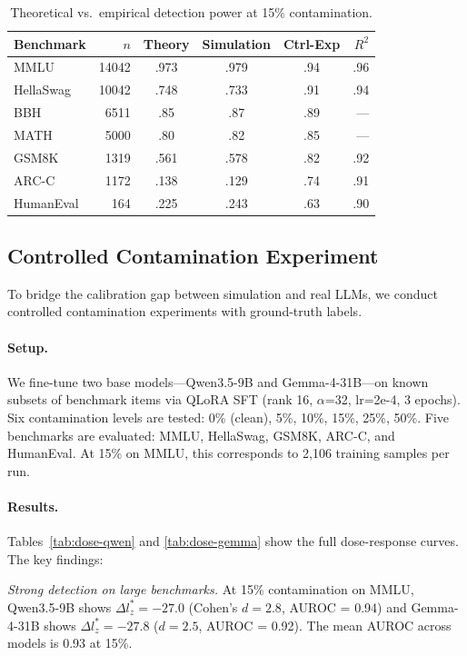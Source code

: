 \documentclass[11pt,a4paper]{article}
\begin{document}
\begin{table}[t]
\centering
\small
\caption{Theoretical vs.\ empirical detection power at 15\% contamination.}
\label{tab:theory-vs-empirical}
\begin{tabular}{lrcccr}
\toprule
\textbf{Benchmark} & $n$ & \textbf{Theory} & \textbf{Simulation} & \textbf{Ctrl-Exp} & $R^2$ \\
\midrule
MMLU & 14042 & .973 & .979 & .94 & .96 \\
HellaSwag & 10042 & .748 & .733 & .91 & .94 \\
BBH & 6511 & .85 & .87 & .89 & --- \\
MATH & 5000 & .80 & .82 & .85 & --- \\
GSM8K & 1319 & .561 & .578 & .82 & .92 \\
ARC-C & 1172 & .138 & .129 & .74 & .91 \\
HumanEval & 164 & .225 & .243 & .63 & .90 \\
\bottomrule
\end{tabular}
\end{table}

\subsection{Controlled Contamination Experiment}
\label{sec:ctrl-contam}

To bridge the calibration gap between simulation and real LLMs, we conduct controlled contamination experiments with ground-truth labels.

\paragraph{Setup.}
We fine-tune two base models---Qwen3.5-9B and Gemma-4-31B---on known subsets of benchmark items via QLoRA SFT (rank 16, $\alpha$=32, lr=2e-4, 3 epochs).
Six contamination levels are tested: 0\% (clean), 5\%, 10\%, 15\%, 25\%, 50\%.
Five benchmarks are evaluated: MMLU, HellaSwag, GSM8K, ARC-C, and HumanEval.
At 15\% on MMLU, this corresponds to 2{,}106 training samples per run.

\paragraph{Results.}
Tables~\ref{tab:dose-qwen} and \ref{tab:dose-gemma} show the full dose-response curves.
The key findings:

\emph{Strong detection on large benchmarks.}
At 15\% contamination on MMLU, Qwen3.5-9B shows $\Delta l_z^* = -27.0$ (Cohen's $d = 2.8$, AUROC = 0.94) and Gemma-4-31B shows $\Delta l_z^* = -27.8$ ($d = 2.5$, AUROC = 0.92).
The mean AUROC across models is 0.93 at 15\%.
\end{document}
